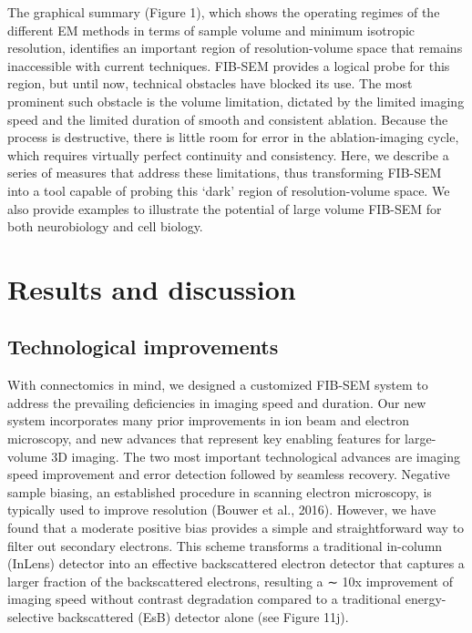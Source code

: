 \documentclass{article}
\begin{document}
The graphical summary (Figure 1), which shows the operating regimes of the different EM methods in terms of sample volume and minimum isotropic resolution, identifies an important region of resolution-volume space that remains inaccessible with current techniques. FIB-SEM provides a logical probe for this region, but until now, technical obstacles have blocked its use. The most prominent such obstacle is the volume limitation, dictated by the limited imaging speed and the limited duration of smooth and consistent ablation. Because the process is destructive, there is little room for error in the ablation-imaging cycle, which requires virtually perfect continuity and consistency. Here, we describe a series of measures that address these limitations, thus transforming FIB-SEM into a tool capable of probing this ‘dark’ region of resolution-volume space. We also provide examples to illustrate the potential of large volume FIB-SEM for both neurobiology and cell biology.

\section*{Results and discussion}

\subsection*{Technological improvements}

With connectomics in mind, we designed a customized FIB-SEM system to address the prevailing deficiencies in imaging speed and duration. Our new system incorporates many prior improvements in ion beam and electron microscopy, and new advances that represent key enabling features for large-volume 3D imaging. The two most important technological advances are imaging speed improvement and error detection followed by seamless recovery. Negative sample biasing, an established procedure in scanning electron microscopy, is typically used to improve resolution (Bouwer et al., 2016). However, we have found that a moderate positive bias provides a simple and straightforward way to filter out secondary electrons. This scheme transforms a traditional in-column (InLens) detector into an effective backscattered electron detector that captures a larger fraction of the backscattered electrons, resulting a ∼ 10x improvement of imaging speed without contrast degradation compared to a traditional energy-selective backscattered (EsB) detector alone (see Figure 11j).
\end{document}

